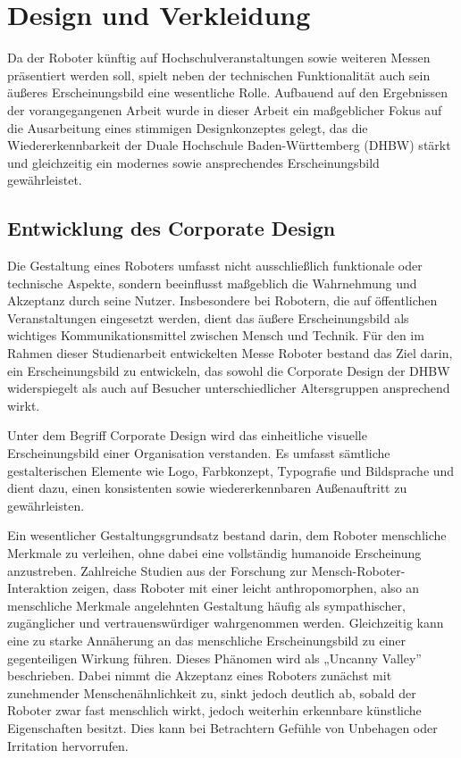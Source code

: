 \chapter{Design und Verkleidung}
\label{cha:Design}

Da der Roboter künftig auf Hochschulveranstaltungen sowie weiteren Messen präsentiert werden soll, spielt neben der technischen Funktionalität auch sein äußeres Erscheinungsbild eine wesentliche Rolle. Aufbauend auf den Ergebnissen der vorangegangenen Arbeit wurde in dieser Arbeit ein maßgeblicher Fokus auf die Ausarbeitung eines stimmigen Designkonzeptes gelegt, das die Wiedererkennbarkeit der Duale Hochschule Baden-Württemberg (DHBW) stärkt und gleichzeitig ein modernes sowie ansprechendes Erscheinungsbild gewährleistet.

\section{Entwicklung des Corporate Design}

Die Gestaltung eines Roboters umfasst nicht ausschließlich funktionale oder technische Aspekte, sondern beeinflusst maßgeblich die Wahrnehmung und Akzeptanz durch seine Nutzer. Insbesondere bei Robotern, die auf öffentlichen Veranstaltungen eingesetzt werden, dient das äußere Erscheinungsbild als wichtiges Kommunikationsmittel zwischen Mensch und Technik. Für den im Rahmen dieser Studienarbeit entwickelten Messe Roboter bestand das Ziel darin, ein Erscheinungsbild zu entwickeln, das sowohl die Corporate Design der DHBW widerspiegelt als auch auf Besucher unterschiedlicher Altersgruppen ansprechend wirkt.

Unter dem Begriff Corporate Design wird das einheitliche visuelle Erscheinungsbild einer Organisation verstanden. Es umfasst sämtliche gestalterischen Elemente wie Logo, Farbkonzept, Typografie und Bildsprache und dient dazu, einen konsistenten sowie wiedererkennbaren Außenauftritt zu gewährleisten. \cite{Helder.2026}

Ein wesentlicher Gestaltungsgrundsatz bestand darin, dem Roboter menschliche Merkmale zu verleihen, ohne dabei eine vollständig humanoide Erscheinung anzustreben. Zahlreiche Studien aus der Forschung zur Mensch-Roboter-Interaktion zeigen, dass Roboter mit einer leicht anthropomorphen, also an menschliche Merkmale angelehnten Gestaltung häufig als sympathischer, zugänglicher und vertrauenswürdiger wahrgenommen werden. Gleichzeitig kann eine zu starke Annäherung an das menschliche Erscheinungsbild zu einer gegenteiligen Wirkung führen. Dieses Phänomen wird als „Uncanny Valley” beschrieben. Dabei nimmt die Akzeptanz eines Roboters zunächst mit zunehmender Menschenähnlichkeit zu, sinkt jedoch deutlich ab, sobald der Roboter zwar fast menschlich wirkt, jedoch weiterhin erkennbare künstliche Eigenschaften besitzt. Dies kann bei Betrachtern Gefühle von Unbehagen oder Irritation hervorrufen. \cite{Uncanny.2026}

